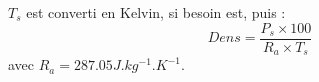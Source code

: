 $T_s$ est converti en Kelvin, si besoin est, puis :
\[
Dens = \frac{P_s\times 100}{R_a \times T_s}
\]
avec $R_a = 287.05 J.kg^{-1}.K^{-1} $.
